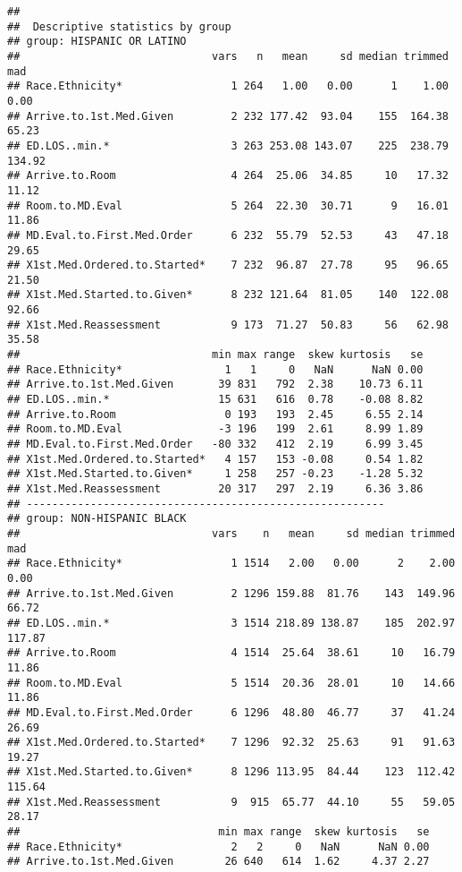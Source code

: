 \documentclass[]{article}
\begin{document}
\begin{verbatim}
## 
##  Descriptive statistics by group 
## group: HISPANIC OR LATINO
##                              vars   n   mean     sd median trimmed    mad
## Race.Ethnicity*                 1 264   1.00   0.00      1    1.00   0.00
## Arrive.to.1st.Med.Given         2 232 177.42  93.04    155  164.38  65.23
## ED.LOS..min.*                   3 263 253.08 143.07    225  238.79 134.92
## Arrive.to.Room                  4 264  25.06  34.85     10   17.32  11.12
## Room.to.MD.Eval                 5 264  22.30  30.71      9   16.01  11.86
## MD.Eval.to.First.Med.Order      6 232  55.79  52.53     43   47.18  29.65
## X1st.Med.Ordered.to.Started*    7 232  96.87  27.78     95   96.65  21.50
## X1st.Med.Started.to.Given*      8 232 121.64  81.05    140  122.08  92.66
## X1st.Med.Reassessment           9 173  71.27  50.83     56   62.98  35.58
##                              min max range  skew kurtosis   se
## Race.Ethnicity*                1   1     0   NaN      NaN 0.00
## Arrive.to.1st.Med.Given       39 831   792  2.38    10.73 6.11
## ED.LOS..min.*                 15 631   616  0.78    -0.08 8.82
## Arrive.to.Room                 0 193   193  2.45     6.55 2.14
## Room.to.MD.Eval               -3 196   199  2.61     8.99 1.89
## MD.Eval.to.First.Med.Order   -80 332   412  2.19     6.99 3.45
## X1st.Med.Ordered.to.Started*   4 157   153 -0.08     0.54 1.82
## X1st.Med.Started.to.Given*     1 258   257 -0.23    -1.28 5.32
## X1st.Med.Reassessment         20 317   297  2.19     6.36 3.86
## -------------------------------------------------------- 
## group: NON-HISPANIC BLACK
##                              vars    n   mean     sd median trimmed    mad
## Race.Ethnicity*                 1 1514   2.00   0.00      2    2.00   0.00
## Arrive.to.1st.Med.Given         2 1296 159.88  81.76    143  149.96  66.72
## ED.LOS..min.*                   3 1514 218.89 138.87    185  202.97 117.87
## Arrive.to.Room                  4 1514  25.64  38.61     10   16.79  11.86
## Room.to.MD.Eval                 5 1514  20.36  28.01     10   14.66  11.86
## MD.Eval.to.First.Med.Order      6 1296  48.80  46.77     37   41.24  26.69
## X1st.Med.Ordered.to.Started*    7 1296  92.32  25.63     91   91.63  19.27
## X1st.Med.Started.to.Given*      8 1296 113.95  84.44    123  112.42 115.64
## X1st.Med.Reassessment           9  915  65.77  44.10     55   59.05  28.17
##                               min max range  skew kurtosis   se
## Race.Ethnicity*                 2   2     0   NaN      NaN 0.00
## Arrive.to.1st.Med.Given        26 640   614  1.62     4.37 2.27

\end{verbatim}
\end{document}
